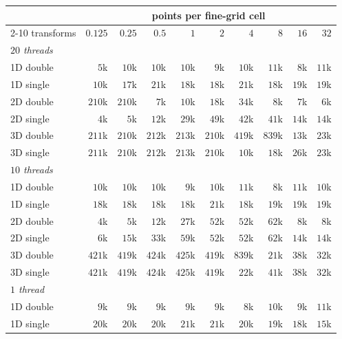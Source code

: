 \begin{table}[p]
    \centering
    \footnotesize
    \setlength{\tabcolsep}{4pt}
    \begin{tabular}{lrrrrrrrrr}
        \toprule
        & \multicolumn{9}{c}{points per fine-grid cell} \\
        \cmidrule(lr){2-10}
        transforms & $0.125$ & $0.25$ & $0.5$ & $1$ & $2$ & $4$ & $8$ & $16$ & $32$ \\
        \midrule
        \multicolumn{10}{l}{\emph{$20$ threads}} \\
        1D double & $5$k & $10$k & $10$k & $10$k & $9$k & $10$k & $11$k & $8$k & $11$k \\
        1D single & $10$k & $17$k & $21$k & $18$k & $18$k & $21$k & $18$k & $19$k & $19$k \\
        2D double & $210$k & $210$k & $7$k & $10$k & $18$k & $34$k & $8$k & $7$k & $6$k \\
        2D single & $4$k & $5$k & $12$k & $29$k & $49$k & $42$k & $41$k & $14$k & $14$k \\
        3D double & $211$k & $210$k & $212$k & $213$k & $210$k & $419$k & $839$k & $13$k & $23$k \\
        3D single & $211$k & $210$k & $212$k & $213$k & $210$k & $10$k & $18$k & $26$k & $23$k \\
        \midrule
        \multicolumn{10}{l}{\emph{$10$ threads}} \\
        1D double & $10$k & $10$k & $10$k & $9$k & $10$k & $11$k & $8$k & $11$k & $10$k \\
        1D single & $18$k & $18$k & $18$k & $18$k & $21$k & $18$k & $19$k & $19$k & $19$k \\
        2D double & $4$k & $5$k & $12$k & $27$k & $52$k & $52$k & $62$k & $8$k & $8$k \\
        2D single & $6$k & $15$k & $33$k & $59$k & $52$k & $52$k & $62$k & $14$k & $14$k \\
        3D double & $421$k & $419$k & $424$k & $425$k & $419$k & $839$k & $21$k & $38$k & $32$k \\
        3D single & $421$k & $419$k & $424$k & $425$k & $419$k & $22$k & $41$k & $38$k & $32$k \\
        \midrule
        \multicolumn{10}{l}{\emph{$1$ thread}} \\
        1D double & $9$k & $9$k & $9$k & $9$k & $9$k & $8$k & $10$k & $9$k & $11$k \\
        1D single & $20$k & $20$k & $20$k & $21$k & $21$k & $20$k & $19$k & $18$k & $15$k \\

\end{tabular}
\end{table}
